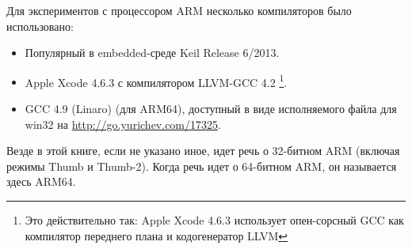 \label{sec:hw_ARM}

\myindex{\idevices}
Для экспериментов с процессором ARM несколько компиляторов было использовано:

\begin{itemize}
\item Популярный в embedded-среде Keil Release 6/2013.

\item Apple Xcode 4.6.3 с компилятором LLVM-GCC 4.2
\footnote{Это действительно так: Apple Xcode 4.6.3 использует опен-сорсный GCC как компилятор переднего плана и кодогенератор LLVM}.

\item GCC 4.9 (Linaro) (для ARM64), 
доступный в виде исполняемого файла для win32 на \url{http://go.yurichev.com/17325}.

\end{itemize}

Везде в этой книге, если не указано иное, идет речь о 32-битном ARM (включая режимы Thumb и Thumb-2).
Когда речь идет о 64-битном ARM, он называется здесь ARM64.







